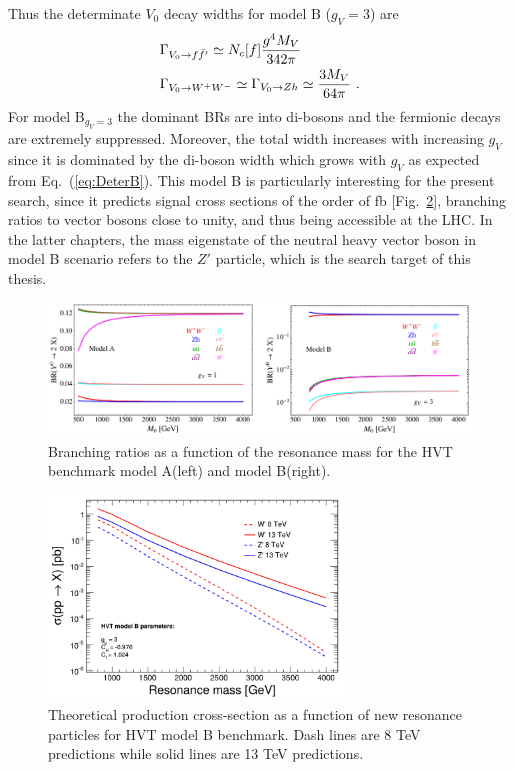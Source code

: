 Thus the determinate $V_{0}$ decay widths for model B ($g_{V}=3$) are
\begin{align}
  &\Gamma_{V_{0}\rightarrow f\bar{f}'}\simeq N_{c}[f]\frac{g^{4}M_{V}}{342\pi}\nonumber\\
  &\Gamma_{V_{0}\rightarrow W^{+}W^{-}}\simeq \Gamma_{V_{0}\rightarrow Zh}\simeq \frac{3M_{V}}{64\pi}\textup{ .}
\end{align}
For model B$_{g_{V}=3}$ the dominant BRs are into di-bosons and the fermionic decays are extremely suppressed. Moreover, the total width increases with increasing $g_{V}$ since it is dominated by the di-boson width which grows with $g_{V}$ as expected from Eq.~({\ref{eq:DeterB}}). This model B is particularly interesting for the present search, since it predicts signal cross sections of the order of fb\cite{HVT} \cite{CMS_AN_2015-186} [Fig.~\ref{fig:xsec}], branching ratios to vector bosons close to unity, and thus being accessible at the LHC. In the latter chapters, the mass eigenstate of the neutral heavy vector boson in model B scenario refers to the $Z'$ particle, which is the search target of this thesis.\\
\newpage
\begin{figure}[hbtp]
  \begin{center}
    \includegraphics[width=\textwidth]{figure/CH1/BRs_modelAvsB.png}
  \end{center}
  \caption{\label{fig:BRs_AvsB}Branching ratios as a function of the resonance mass for the HVT benchmark model A(left) and model B(right).}
\end{figure}

\begin{figure}[hbtp]
  \begin{center}
    \includegraphics[width=0.7\textwidth]{figure/CH1/xsec.png}
  \end{center}
  \caption{\label{fig:xsec}Theoretical production cross-section as a function of new resonance particles for HVT model B benchmark. Dash lines are 8 TeV predictions while solid lines are 13 TeV predictions.}
\end{figure}
